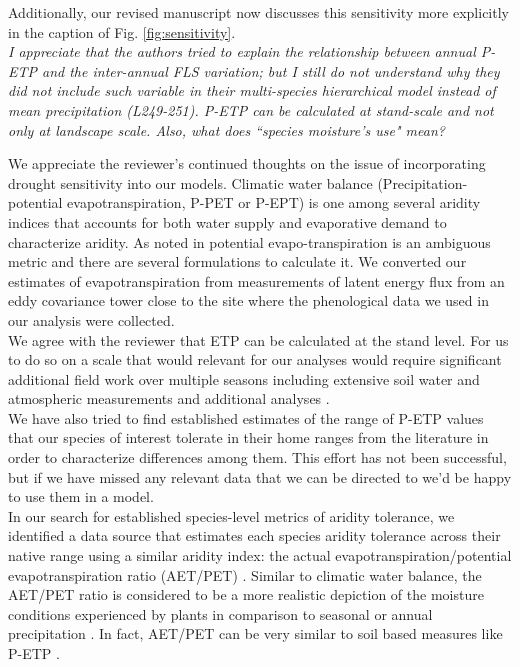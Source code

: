 \documentclass{article}[11pt]
\begin{document}
Additionally, our revised manuscript now discusses this sensitivity more explicitly in the caption of Fig. \ref{fig:sensitivity}.\\


\textit{I appreciate that the authors tried to explain the relationship between annual P-ETP and the inter-annual FLS variation; but I still do not understand why they did not include such variable in their multi-species hierarchical model instead of mean precipitation (L249-251). P-ETP can be calculated at stand-scale and not only at landscape scale. Also, what does ``species moisture's use" mean?}

We appreciate the reviewer's continued thoughts on the issue of incorporating drought sensitivity into our models. Climatic water balance (Precipitation-potential evapotranspiration, P-PET or P-EPT) is one among several aridity indices that accounts for both water supply and evaporative demand to characterize aridity. As noted in \citet{Speich:2019aa} potential evapo-transpiration is an ambiguous metric and there are several formulations to calculate it. We converted our estimates of evapotranspiration from measurements of latent energy flux \citep{Knauer2018} from an eddy covariance tower close to the site where the phenological data we used in our analysis were collected.\\

We agree with the reviewer that ETP can be calculated at the stand level. For us to do so on a scale that would relevant for our analyses would require significant additional field work over multiple seasons including extensive soil water and atmospheric measurements and additional analyses \citep{GARNIER:1952aa,Allan:1998aa}.\\ 

We have also tried to find established estimates of the range of P-ETP values that our species of interest tolerate in their home ranges from the literature in order to characterize differences among them. This effort has not been successful, but if we have missed any relevant data that we can be directed to we'd be happy to use them in a model.\\ 

In our search for established species-level metrics of aridity tolerance, we identified a data source that estimates each species aridity tolerance across their native range using a similar aridity index: the actual evapotranspiration/potential evapotranspiration ratio (AET/PET) \citep{Thomspson2012}. Similar to climatic water balance, the AET/PET ratio is considered to be a more realistic depiction of the moisture conditions experienced by plants in comparison to seasonal or annual precipitation \citep{Thomspson2012}. In fact, AET/PET can be very similar to soil based measures like  P-ETP \citep{Speich:2019aa}.\\
\end{document}
